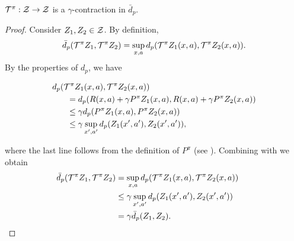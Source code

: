 \documentclass{article}
\def \cTpi {\cT^\pi}
\def \dip {\bar d_p}
\begin{document}
\begin{lem}
$\cTpi : \cZ \to \cZ$ is a $\gamma$-contraction in $\dip$.
\end{lem}
\begin{proof}
Consider $Z_1, Z_2 \in \mathcal{Z}$. By definition,
\begin{equation}
\dip(\cTpi Z_1, \cTpi Z_2) = \sup_{x,a} d_p(\cTpi Z_1(x, a), \cTpi Z_2(x, a)) . \label{eqn:definition_tcpi_distance}
\end{equation}
By the properties of $d_p$, we have
\begin{small}
\begin{align*}
d_p(\cTpi Z_1(x,a), \cTpi Z_2(x,a)) &\\
&\hspace{-10em}= d_p(R(x,a) + \gamma P^\pi Z_1(x,a), R(x,a) + \gamma P^\pi Z_2(x,a)) \\
&\hspace{-10em}\le \gamma d_p(P^\pi Z_1(x,a), P^\pi Z_2(x,a)) \\
&\hspace{-10em}\le \gamma \sup_{x',a'} d_p(Z_1(x',a'), Z_2(x',a')),
\end{align*}
\end{small}
where the last line follows from the definition of $P^\pi$ (see ). Combining with  we obtain
\begin{align*}
\hspace{-1.5em}\dip(\cTpi Z_1, \cTpi Z_2) &= \sup_{x,a} d_p(\cTpi Z_1(x,a), \cTpi Z_2(x,a)) \\
&\le \gamma \sup_{x', a'} d_p(Z_1(x',a'), Z_2(x', a')) \hspace{-2em} \\
&= \gamma \dip(Z_1, Z_2) .\qedhere
\end{align*}
\end{proof}
\end{document}
